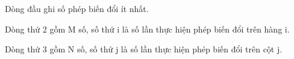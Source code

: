 Dòng đầu ghi số phép biến đổi ít nhất.

Dòng thứ 2 gồm M số, số thứ i là số lần thực hiện phép biến đổi trên hàng i.

Dòng thứ 3 gồm N số, số thứ j là số lần thực hiện phép biến đổi trên cột j.